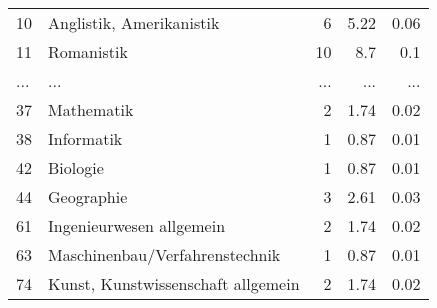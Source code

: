 \begin{longtable}{lXrrr}
        10 & \multicolumn{1}{X}{Anglistik, Amerikanistik} & %
          \num{6} &
          \num[round-mode=places,round-precision=2]{5,22} &
          \num[round-mode=places,round-precision=2]{0,06} \\
        11 & \multicolumn{1}{X}{Romanistik} & %
          \num{10} &
          \num[round-mode=places,round-precision=2]{8,7} &
          \num[round-mode=places,round-precision=2]{0,1} \\
       ... & ... & ... & ... & ... \\
        37 & \multicolumn{1}{X}{Mathematik} & %
          \num{2} &
          \num[round-mode=places,round-precision=2]{1,74} &
          \num[round-mode=places,round-precision=2]{0,02} \\

        38 & \multicolumn{1}{X}{Informatik} & %
          \num{1} &
          \num[round-mode=places,round-precision=2]{0,87} &
          \num[round-mode=places,round-precision=2]{0,01} \\

        42 & \multicolumn{1}{X}{Biologie} & %
          \num{1} &
          \num[round-mode=places,round-precision=2]{0,87} &
          \num[round-mode=places,round-precision=2]{0,01} \\

        44 & \multicolumn{1}{X}{Geographie} & %
          \num{3} &
          \num[round-mode=places,round-precision=2]{2,61} &
          \num[round-mode=places,round-precision=2]{0,03} \\

        61 & \multicolumn{1}{X}{Ingenieurwesen allgemein} & %
          \num{2} &
          \num[round-mode=places,round-precision=2]{1,74} &
          \num[round-mode=places,round-precision=2]{0,02} \\

        63 & \multicolumn{1}{X}{Maschinenbau/Verfahrenstechnik} & %
          \num{1} &
          \num[round-mode=places,round-precision=2]{0,87} &
          \num[round-mode=places,round-precision=2]{0,01} \\

        74 & \multicolumn{1}{X}{Kunst, Kunstwissenschaft allgemein} & %
          \num{2} &
          \num[round-mode=places,round-precision=2]{1,74} &
          \num[round-mode=places,round-precision=2]{0,02} \\


\end{longtable}
